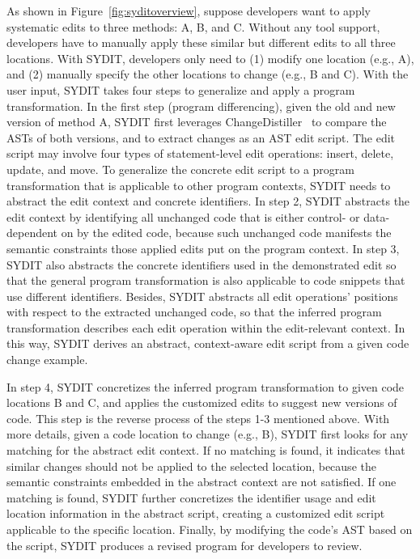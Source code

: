 As shown in Figure~\ref{fig:syditoverview}, suppose developers want to apply systematic edits to three methods: A, B, and C. Without any tool support, developers have to manually apply these similar but different edits to all three locations. With SYDIT, developers only need to (1) modify one location (e.g., A), and (2) manually specify the other locations to change (e.g., B and C). With the user input, SYDIT takes four steps to generalize and apply a program transformation. In the first step (program differencing), given the old and new version of method A, SYDIT first leverages ChangeDistiller~\cite{FWP2007} to compare the ASTs of both versions, and to extract changes as an AST edit script. The edit script may involve four types of statement-level edit operations: insert, delete, update, and move. To generalize the concrete edit script to a program transformation that is applicable to other program contexts, SYDIT needs to abstract the edit context and concrete identifiers. In step 2, SYDIT abstracts the edit context by identifying all unchanged code that is either control- or data-dependent on by the edited code, because such unchanged code manifests the semantic constraints those applied edits put on the program context. In step 3, SYDIT also abstracts the concrete identifiers used in the demonstrated edit so that the general program transformation is also applicable to code snippets that use different identifiers. Besides, SYDIT abstracts all edit operations' positions with respect to the extracted unchanged code, so that the inferred program transformation describes each edit operation within the edit-relevant context.
In this way, SYDIT derives an abstract, context-aware edit script from a given code change example.

In step 4, SYDIT concretizes the inferred program transformation to given code locations B and C, and applies the customized edits to suggest new versions of code. This step is the reverse process of the steps 1-3 mentioned above. With more details, given a code location to change (e.g., B), SYDIT first looks for any matching for the abstract edit context. If no matching is found, it indicates that similar changes should not be applied to the selected location, because the semantic constraints embedded in the abstract context are not satisfied. If one matching is found, SYDIT further concretizes the identifier usage and edit location information in the abstract script, creating a customized edit script applicable to the specific location. Finally, by modifying the code's AST based on the script, SYDIT produces a revised program for developers to review.

